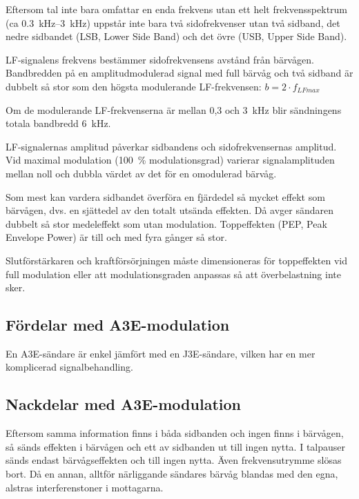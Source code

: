 Eftersom tal inte bara omfattar en enda frekvens utan ett helt frekvensspektrum
(ca \SIrange{0,3}{3}{\kilo\hertz}) uppstår inte bara två sidofrekvenser utan två
sidband, det nedre sidbandet (LSB, Lower Side Band) och det övre (USB, Upper
Side Band).

LF-signalens frekvens bestämmer sidofrekvensens avstånd från bärvågen.
Bandbredden på en amplitudmodulerad signal med full bärvåg och två sidband är
dubbelt så stor som den högsta modulerande LF-frekvensen:
\(b= 2 \cdot f_{LFmax}\)

Om de modulerande LF-frekvenserna är mellan 0,3 och \qty{3}{\kilo\hertz} blir
sändningens totala bandbredd \qty{6}{\kilo\hertz}.

LF-signalernas amplitud påverkar sidbandens och sidofrekvensernas amplitud.
Vid maximal modulation (\qty{100}{\percent} modulationsgrad) varierar
signalamplituden mellan noll och dubbla värdet av det för en omodulerad bärvåg.

Som mest kan vardera sidbandet överföra en fjärdedel så mycket effekt som
bärvågen, dvs. en sjättedel av den totalt utsända effekten.
Då avger sändaren dubbelt så stor medeleffekt som utan modulation.
Toppeffekten (PEP, Peak Envelope Power) är till och med fyra gånger så stor.

Slutförstärkaren och kraftförsörjningen måste dimensioneras för toppeffekten vid
full modulation eller att modulationsgraden anpassas så att överbelastning inte
sker.

\subsection{Fördelar med A3E-modulation}

En A3E-sändare är enkel jämfört med en J3E-sändare, vilken har en mer
komplicerad signalbehandling.


\subsection{Nackdelar med A3E-modulation}

Eftersom samma information finns i båda sidbanden och ingen finns i bärvågen,
så sänds effekten i bärvågen och ett av sidbanden ut till ingen nytta.
I talpauser sänds endast bärvågseffekten och till ingen nytta.
Även frekvensutrymme slösas bort.
Då en annan, alltför närliggande sändares bärvåg blandas med den egna,
alstras interferenstoner i mottagarna.

